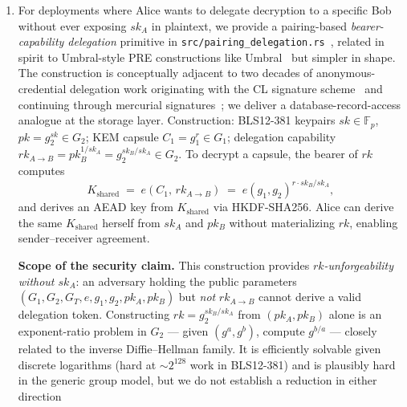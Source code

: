 \documentclass[11pt,letterpaper]{article}
\begin{document}
\begin{enumerate}[nosep]
  a fundamental consequence of additive arithmetic. The
  $(\alpha, \beta)$ capability plus the delegatee's own gauge key
  yields a 2-equations-in-2-unknowns linear system whose solution
  is the delegator's secret in $O(1)$ field operations. This means
  Aff$(\mathbb{R})$ delegation requires \emph{both} the delegatee
  being honest \emph{and} the delegatee's key remaining
  uncompromised; a key-leak in the delegatee compounds with a
  capability leak to immediately expose the delegator.
\item For deployments where Alice wants to delegate decryption to
  a specific Bob without ever exposing $sk_A$ in plaintext, we
  provide a pairing-based \emph{bearer-capability delegation}
  primitive in
  \texttt{src/pairing\_delegation.rs}~\cite{gigi2026code}, related
  in spirit to Umbral-style PRE constructions like
  Umbral~\cite{nunez2018umbral} but simpler in shape. The
  construction is conceptually adjacent to two decades of
  anonymous-credential delegation work originating with the CL
  signature scheme~\cite{camenisch2004clsigs} and continuing
  through mercurial
  signatures~\cite{camenisch2019mercurial, garman2024mercurial};
  we deliver a database-record-access analogue at the storage
  layer. Construction: BLS12-381 keypairs $sk \in \mathbb{F}_p$,
  $pk = g_2^{sk} \in G_2$; KEM capsule $C_1 = g_1^r \in G_1$;
  delegation capability
  $rk_{A \to B} = pk_B^{1/sk_A} = g_2^{sk_B / sk_A} \in G_2$. To
  decrypt a capsule, the bearer of $rk$ computes
  \[
  K_{\mathrm{shared}} \;=\; e(C_1,\, rk_{A \to B})
                       \;=\; e(g_1, g_2)^{r \cdot sk_B / sk_A},
  \]
  and derives an AEAD key from $K_{\mathrm{shared}}$ via
  HKDF-SHA256. Alice can derive the same $K_{\mathrm{shared}}$
  herself from $sk_A$ and $pk_B$ without materializing $rk$,
  enabling sender--receiver agreement.
  \par
  \par
  \textbf{Scope of the security claim.} This construction provides
  \emph{$rk$-unforgeability without $sk_A$}: an adversary holding
  the public parameters $(G_1, G_2, G_T, e, g_1, g_2, pk_A, pk_B)$
  but \emph{not} $rk_{A \to B}$ cannot derive a valid delegation
  token. Constructing $rk = g_2^{sk_B / sk_A}$ from
  $(pk_A, pk_B)$ alone is an exponent-ratio problem in $G_2$
  --- given $(g^a, g^b)$, compute $g^{b/a}$ --- closely related
  to the inverse Diffie--Hellman family. It is efficiently
  solvable given discrete logarithms (hard at ${\sim}2^{128}$
  work in BLS12-381) and is plausibly hard in the generic group
  model, but we do not establish a reduction in either direction

\end{enumerate}
\end{document}
